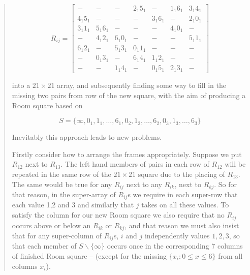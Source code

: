 \documentclass[
  11pt,
  a4paper]{book}
\begin{document}
\begin{quote}
\begin{equation}
  R_{ij} = \begin{bmatrix}
             - &           - &           - &  2_{1}5_{1} &           - &  1_{1}6_{1} &  3_{1}4_{1} \\
    4_{1}5_{1} &           - &           - &           - &  3_{1}6_{1} &           - &  2_{1}0_{1} \\
    3_{1}1_{1} &  5_{1}6_{1} &           - &           - &           - &  4_{1}0_{1} &   - \\
             - &  4_{1}2_{1} &  6_{1}0_{1} &           - &           - &           - &  5_{1}1_{1} \\
    6_{1}2_{1} &           - &  5_{1}3_{1} &  0_{1}1_{1} &           - &           - &   - \\
             - &  0_{1}3_{1} &           - &  6_{1}4_{1} &  1_{1}2_{1} &           - &   - \\
             - &           - &  1_{1}4_{1} &           - &  0_{1}5_{1} &  2_{1}3_{1} &   - 
  \end{bmatrix}
  \label{eq:triple-room-frame}
\end{equation}

into a $21 \times 21$ array, and subsequently finding some way to
fill in the missing two pairs from row of the new square,
with the aim of producing a Room square based on

\begin{equation}
S = \{\infty, 0_1, 1_1, \ldots, 6_1, 0_2, 1_2, \ldots, 6_2, 0_3, 1_3, \ldots, 6_3\}
\end{equation}

Inevitably this approach leads to new problems.

Firstly consider how to arrange the frames appropriately.
Suppose we put $R_{12}$ next to $R_{13}$. The left hand
members of pairs in each row of $R_{12}$ will be repeated in
the same row of the $21 \times 21$ square due to the placing of
$R_{13}$. The same would be true for any $R_{ij}$ next to
any $R_{ik}$, next to $R_{kj}$. So for that reason, in the
super-array of $R_{ij}$s we require in each super-row that
each value 1,2 and 3 and similarly that $j$ takes on all
these values.  To satisfy the column for our new Room square
we also require that no $R_{ij}$ occurs above or below an
$R_{ik}$ or $R_{kj}$, and that reason we must also insist
that for any super-column of $R_{ij}$s, $i$ and $j$
independently values $1, 2, 3$, so that each member of
$S \backslash \{\infty\}$ occurs once in the corresponding 7
columns of finished Room square – (except for the missing
$\{x_i: 0 \leq x \leq 6\}$ from all columns $x_i$).


\end{quote}
\end{document}
